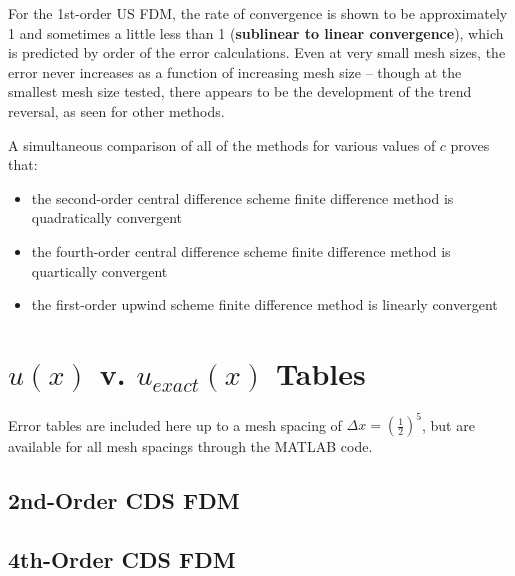 \documentclass[10pt, reqno]{article}		%
\numberwithin{equation}{section}
\begin{document}
For the 1st-order US FDM, the rate of convergence is shown to be approximately 1 and sometimes a little less than 1 (\textbf{sublinear to linear convergence}), which is predicted by order of the error calculations. Even at very small mesh sizes, the error never increases as a function of increasing mesh size -- though at the smallest mesh size tested, there appears to be the development of the trend reversal, as seen for other methods.

\vspace{30 pt}

A simultaneous comparison of all of the methods for various values of $c$ proves that:

\begin{itemize}
	\item the second-order central difference scheme finite difference method is quadratically convergent
	\item the fourth-order central difference scheme finite difference method is quartically convergent
	\item the first-order upwind scheme finite difference method is linearly convergent
\end{itemize}

\newpage

\appendix

\section{$u(x)$ v. $u_{exact}(x)$ Tables}

Error tables are included here up to a mesh spacing of $\Delta x = \left(\frac{1}{2}\right)^5$, but are available for all mesh spacings through the MATLAB code.

\subsection{2nd-Order CDS FDM}



\newline


\newline


\newpage

\subsection{4th-Order CDS FDM}
\end{document}
